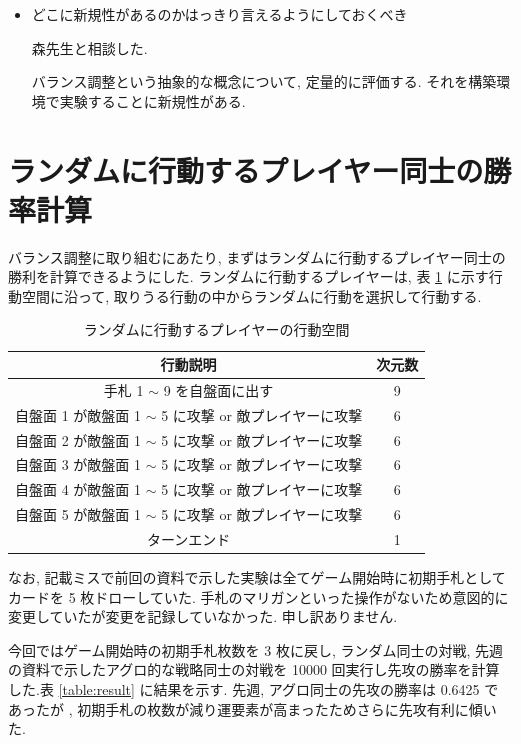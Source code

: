 \documentclass{jarticle}     %
\begin{document}
\begin{itemize}
  \item どこに新規性があるのかはっきり言えるようにしておくべき
  \par
  森先生と相談した. 
  \par
  バランス調整という抽象的な概念について, 定量的に評価する. それを構築環境で実験することに新規性がある.

\end{itemize}


\section{ランダムに行動するプレイヤー同士の勝率計算}
バランス調整に取り組むにあたり, まずはランダムに行動するプレイヤー同士の勝利を計算できるようにした.
ランダムに行動するプレイヤーは, 表 \ref{table:action2-2} に示す行動空間に沿って, 取りうる行動の中からランダムに行動を選択して行動する.
\begin{table}[t]
  \centering
  \caption{ランダムに行動するプレイヤーの行動空間}
  \label{table:action2-2}
  \begin{tabular}{|c|c|}
  \hline
  行動説明                          & 次元数        \\ \hline
  手札 1 $\sim$ 9 を自盤面に出す             & 9          \\ \hline
  自盤面 1 が敵盤面 1 $\sim$ 5 に攻撃 or 敵プレイヤーに攻撃    & 6          \\ \hline
  自盤面 2 が敵盤面 1 $\sim$ 5 に攻撃 or 敵プレイヤーに攻撃    & 6   \\ \hline
  自盤面 3 が敵盤面 1 $\sim$ 5 に攻撃 or 敵プレイヤーに攻撃    & 6\\ \hline
  自盤面 4 が敵盤面 1 $\sim$ 5 に攻撃 or 敵プレイヤーに攻撃    & 6 \\ \hline
  自盤面 5 が敵盤面 1 $\sim$ 5 に攻撃 or 敵プレイヤーに攻撃    & 6\\ \hline
  ターンエンド & 1 \\ \hline
  \end{tabular}
  \end{table}
なお, 記載ミスで前回の資料で示した実験は全てゲーム開始時に初期手札としてカードを 5 枚ドローしていた.
手札のマリガンといった操作がないため意図的に変更していたが変更を記録していなかった. 申し訳ありません.
\par
今回ではゲーム開始時の初期手札枚数を 3 枚に戻し, ランダム同士の対戦, 先週の資料で示したアグロ的な戦略同士の対戦を 10000 回実行し先攻の勝率を計算した.表 \ref{table:result} に結果を示す.
先週, アグロ同士の先攻の勝率は 0.6425 であったが , 初期手札の枚数が減り運要素が高まったためさらに先攻有利に傾いた.
\end{document}
